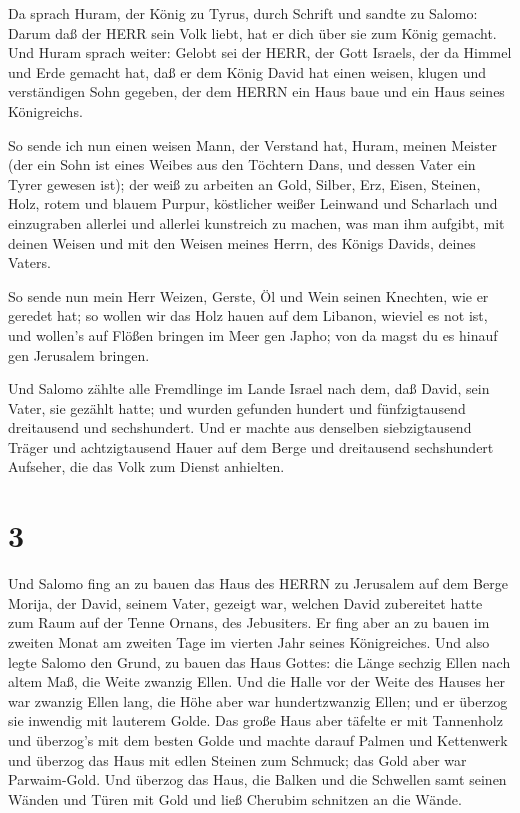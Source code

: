  Da sprach Huram, der König zu Tyrus, durch Schrift und
sandte zu Salomo: Darum daß der HERR sein Volk liebt, hat er dich über
sie zum König gemacht.  Und Huram sprach weiter: Gelobt sei
der HERR, der Gott Israels, der da Himmel und Erde gemacht hat, daß er
dem König David hat einen weisen, klugen und verständigen Sohn gegeben,
der dem HERRN ein Haus baue und ein Haus seines Königreichs.

 So sende ich nun einen weisen Mann, der Verstand hat,
Huram, meinen Meister  (der ein Sohn ist eines Weibes aus
den Töchtern Dans, und dessen Vater ein Tyrer gewesen ist); der weiß zu
arbeiten an Gold, Silber, Erz, Eisen, Steinen, Holz, rotem und blauem
Purpur, köstlicher weißer Leinwand und Scharlach und einzugraben
allerlei und allerlei kunstreich zu machen, was man ihm aufgibt, mit
deinen Weisen und mit den Weisen meines Herrn, des Königs Davids, deines
Vaters.

 So sende nun mein Herr Weizen, Gerste, Öl und Wein seinen
Knechten, wie er geredet hat;  so wollen wir das Holz hauen
auf dem Libanon, wieviel es not ist, und wollen's auf Flößen bringen im
Meer gen Japho; von da magst du es hinauf gen Jerusalem bringen.

 Und Salomo zählte alle Fremdlinge im Lande Israel nach
dem, daß David, sein Vater, sie gezählt hatte; und wurden gefunden
hundert und fünfzigtausend dreitausend und sechshundert. 
Und er machte aus denselben siebzigtausend Träger und achtzigtausend
Hauer auf dem Berge und dreitausend sechshundert Aufseher, die das Volk
zum Dienst anhielten.

\hypertarget{section-2}{%
\section{3}\label{section-2}}

 Und Salomo fing an zu bauen das Haus des HERRN zu Jerusalem
auf dem Berge Morija, der David, seinem Vater, gezeigt war, welchen
David zubereitet hatte zum Raum auf der Tenne Ornans, des Jebusiters.
 Er fing aber an zu bauen im zweiten Monat am zweiten Tage
im vierten Jahr seines Königreiches.  Und also legte Salomo
den Grund, zu bauen das Haus Gottes: die Länge sechzig Ellen nach altem
Maß, die Weite zwanzig Ellen.  Und die Halle vor der Weite
des Hauses her war zwanzig Ellen lang, die Höhe aber war hundertzwanzig
Ellen; und er überzog sie inwendig mit lauterem Golde.  Das
große Haus aber täfelte er mit Tannenholz und überzog's mit dem besten
Golde und machte darauf Palmen und Kettenwerk  und überzog
das Haus mit edlen Steinen zum Schmuck; das Gold aber war Parwaim-Gold.
 Und überzog das Haus, die Balken und die Schwellen samt
seinen Wänden und Türen mit Gold und ließ Cherubim schnitzen an die
Wände.

